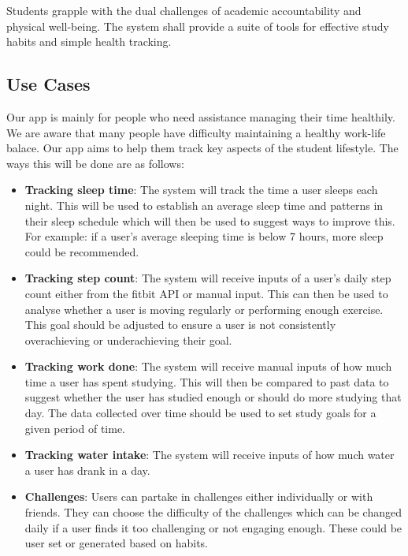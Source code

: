 \documentclass[12pt]{article}
\begin{document}
Students grapple with the dual challenges of academic accountability and
physical well-being. The system shall provide a suite of tools for effective
study habits and simple health tracking.
 
\subsection{Use Cases}

Our app is mainly for people who need assistance managing their time healthily.
We are aware that many people have difficulty maintaining a healthy work-life
balace. Our app aims to help them track key aspects of the student lifestyle.
The ways this will be done are as follows: 

\begin{itemize}

    \item \textbf{Tracking sleep time}: The system will track the time a user
        sleeps each night. This will be used to establish an average sleep time
        and patterns in their sleep schedule which will then be used to suggest
        ways to improve this. For example: if a user's average sleeping time is
        below 7 hours, more sleep could be recommended.
    
    \item \textbf{Tracking step count}: The system will receive inputs of a user's daily
        step count either from the fitbit API or manual input. This can then be
        used to analyse whether a user is moving regularly or performing enough
        exercise. This goal should be adjusted to ensure a user is not
        consistently overachieving or underachieving their goal.

    \item \textbf{Tracking work done}: The system will receive manual inputs of how much
        time a user has spent studying. This will then be compared to past data
        to suggest whether the user has studied enough or should do more
        studying that day. The data collected over time should be used to set
        study goals for a given period of time.
    
    \item \textbf{Tracking water intake}: The system will receive inputs of how much
        water a user has drank in a day.

    \item \textbf{Challenges}: Users can partake in challenges either individually or
        with friends. They can choose the difficulty of the challenges which
        can be changed daily if a user finds it too challenging or not engaging
        enough. These could be user set or generated based on habits. 

\end{itemize}
\end{document}
